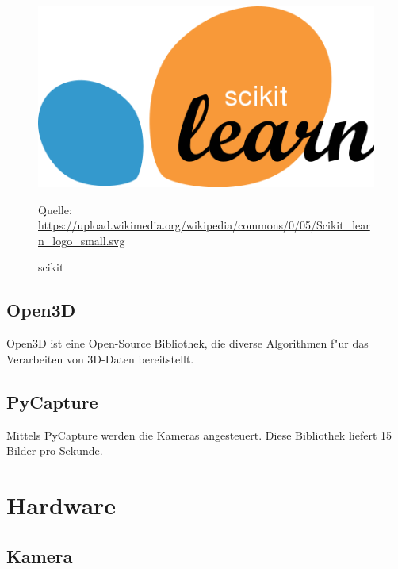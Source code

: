 \begin{figure}[H]
	\includegraphics[scale=0.2]{bilder/scikit}
	\caption[scikit]{scikit}
	\small Quelle: \url{https://upload.wikimedia.org/wikipedia/commons/0/05/Scikit_learn_logo_small.svg}
\end{figure}

\subsection{Open3D}
\label{sec:open3d}

Open3D ist eine Open-Source Bibliothek, die diverse Algorithmen f"ur das Verarbeiten von 3D-Daten bereitstellt.

\subsection{PyCapture}
\label{sec:pycapture}

Mittels PyCapture werden die Kameras angesteuert. Diese Bibliothek liefert 15 Bilder pro Sekunde.

\section{Hardware}
\label{sec:hardware}

\subsection{Kamera}
\label{sec:kamera}

